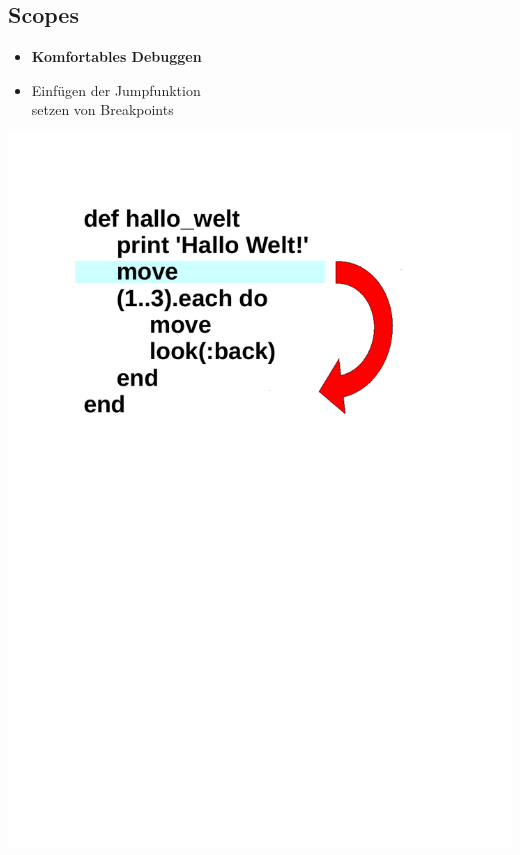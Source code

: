 \subsection{Scopes}




\begin{frame}
	\begin{itemize}
		\item[]\textbf{Komfortables Debuggen} \\
		\item[]	Einfügen der Jumpfunktion\\
		setzen von Breakpoints\\ 	
	\end{itemize}
\end{frame}

\begin{frame}
	\begin{center}
		\includegraphics[scale=0.4]{scopes/Jump1.pdf}
	\end{center}
\end{frame}	

